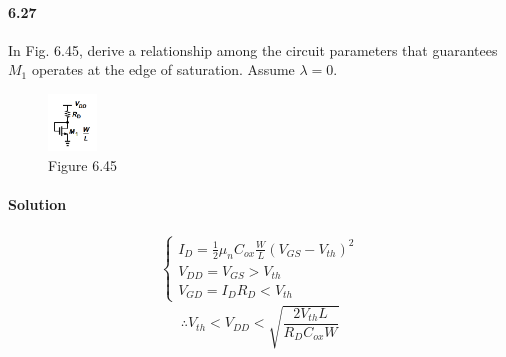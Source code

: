 \documentclass[hyperref, UTF8]{ctexart}
\begin{document}
\paragraph{6.27}
In Fig. 6.45, derive a relationship among the circuit parameters that guarantees $M_1$ operates at 
the edge of saturation. Assume $\lambda = 0$.

\begin{figure}[!htb]
    \centering
    \includegraphics[width=0.115\textwidth]{f6-45.png}
    \caption*{Figure 6.45}
\end{figure}

\paragraph{Solution}
\begin{gather*}
    \left\{ \begin{gathered}
        I_D =  \frac{1}{2} \mu_n C_{ox} \frac{W}{L}(V_{GS}-V_{th})^2 \\
        V_{DD} = V_{GS} > V_{th} \\
        V_{GD} = I_DR_D < V_{th}
    \end{gathered} \right.
\end{gather*}
$$\therefore
V_{th} < V_{DD} < \sqrt{\frac{2V_{th}L}{R_D C_{ox} W}}
$$
\end{document}
